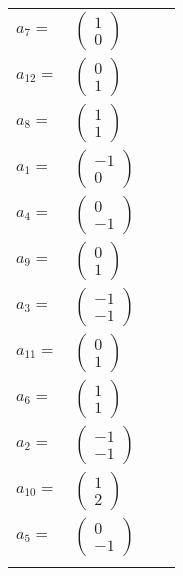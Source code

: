 \documentclass[1p]{elsarticle_modified}
\theoremstyle{definition}
\begin{document}
\begin{tabular}{m{7pt} m{180pt} m{7pt} m{180pt} }
\flushright $a_{7}=$&$\begin{pmatrix}1\\0\end{pmatrix}$ \\
\flushright $a_{12}=$&$\begin{pmatrix}0\\1\end{pmatrix}$ \\
\flushright $a_{8}=$&$\begin{pmatrix}1\\1\end{pmatrix}$ \\
\flushright $a_{1}=$&$\begin{pmatrix}-1\\0\end{pmatrix}$ \\
\flushright $a_{4}=$&$\begin{pmatrix}0\\-1\end{pmatrix}$ \\
\flushright $a_{9}=$&$\begin{pmatrix}0\\1\end{pmatrix}$ \\
\flushright $a_{3}=$&$\begin{pmatrix}-1\\-1\end{pmatrix}$ \\
\flushright $a_{11}=$&$\begin{pmatrix}0\\1\end{pmatrix}$ \\
\flushright $a_{6}=$&$\begin{pmatrix}1\\1\end{pmatrix}$ \\
\flushright $a_{2}=$&$\begin{pmatrix}-1\\-1\end{pmatrix}$ \\
\flushright $a_{10}=$&$\begin{pmatrix}1\\2\end{pmatrix}$ \\
\flushright $a_{5}=$&$\begin{pmatrix}0\\-1\end{pmatrix}$\\&\end{tabular}
\end{document}
